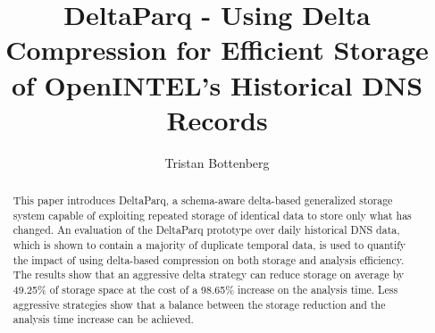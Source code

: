 \documentclass[acmtog, authorversion, tikz, border=10pt]{acmart}
\begin{document}
\title{DeltaParq -  Using Delta Compression for Efficient Storage of OpenINTEL's Historical DNS Records}


\author{Tristan Bottenberg}




\begin{abstract}
    This paper introduces DeltaParq, a schema-aware delta-based generalized storage 
    system capable of exploiting repeated storage of identical data to store only what has changed.
    An evaluation of the DeltaParq prototype over daily historical DNS data, which is shown to contain 
    a majority of duplicate temporal data, is used to quantify the impact of using delta-based 
    compression on both storage and analysis efficiency. The results show that an aggressive delta 
    strategy can reduce storage on average by 49.25\% of storage space at the cost of a 98.65\% increase 
    on the analysis time. Less aggressive strategies show that a balance between the storage 
    reduction and the analysis time increase can be achieved.
\end{abstract}


\end{document}
